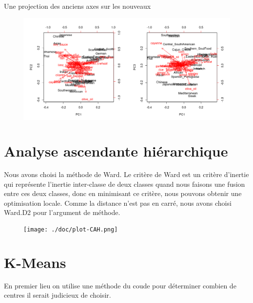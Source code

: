 \documentclass[a4paper, titlepage]{report}
\begin{document}
Une projection des anciens axes sur les nouveaux

\begin{figure}[h]
	\begin{center}
		\includegraphics[scale = 0.32]{./doc/biplot-recette-pays.png}
	\end{center}
\end{figure}

\section{Analyse ascendante hiérarchique}
Nous avons choisi la méthode de Ward. Le critère de Ward est un critère d'inertie qui représente l'inertie inter-classe de deux classes quand nous faisons une fusion entre ces deux classes, donc en minimisant ce critère, nous pouvons obtenir une optimisation locale. Comme la distance n'est pas en carré, nous avons choisi Ward.D2 pour l'argument de méthode.
\begin{figure}[h]
	\begin{center}
		\texttt{[image: ./doc/plot-CAH.png]}
	\end{center}
\end{figure}

\section{K-Means}

En premier lieu on utilise une méthode du coude pour déterminer combien de centres il serait judicieux de choisir.
\end{document}
